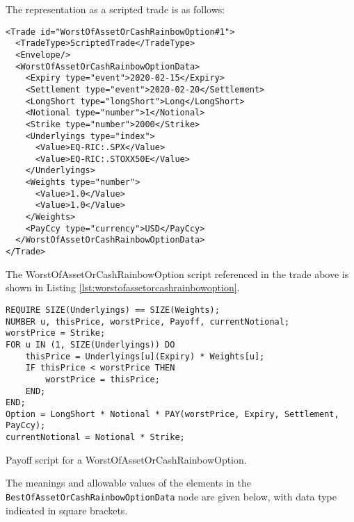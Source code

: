 The representation as a scripted trade is as follows:

\begin{verbatim}
<Trade id="WorstOfAssetOrCashRainbowOption#1">
  <TradeType>ScriptedTrade</TradeType>
  <Envelope/>
  <WorstOfAssetOrCashRainbowOptionData>
    <Expiry type="event">2020-02-15</Expiry>
    <Settlement type="event">2020-02-20</Settlement>
    <LongShort type="longShort">Long</LongShort>
    <Notional type="number">1</Notional>
    <Strike type="number">2000</Strike>
    <Underlyings type="index">
      <Value>EQ-RIC:.SPX</Value>
      <Value>EQ-RIC:.STOXX50E</Value>
    </Underlyings>
    <Weights type="number">
      <Value>1.0</Value>
      <Value>1.0</Value>
    </Weights>
    <PayCcy type="currency">USD</PayCcy>
  </WorstOfAssetOrCashRainbowOptionData>
</Trade>
\end{verbatim}

The WorstOfAssetOrCashRainbowOption script referenced in the trade above is
shown in Listing \ref{lst:worstofassetorcashrainbowoption}.

\begin{listing}[hbt]
\begin{verbatim}
REQUIRE SIZE(Underlyings) == SIZE(Weights);
NUMBER u, thisPrice, worstPrice, Payoff, currentNotional;
worstPrice = Strike;
FOR u IN (1, SIZE(Underlyings)) DO
    thisPrice = Underlyings[u](Expiry) * Weights[u];
    IF thisPrice < worstPrice THEN
        worstPrice = thisPrice;
    END;
END;
Option = LongShort * Notional * PAY(worstPrice, Expiry, Settlement, PayCcy);
currentNotional = Notional * Strike;
\end{verbatim}
\caption{Payoff script for a WorstOfAssetOrCashRainbowOption.}
\label{lst:worstofassetorcashrainbowoption}
\end{listing}

The meanings and allowable values of the elements in the
\lstinline!BestOfAssetOrCashRainbowOptionData! node are given below, with data
type indicated in square brackets.

